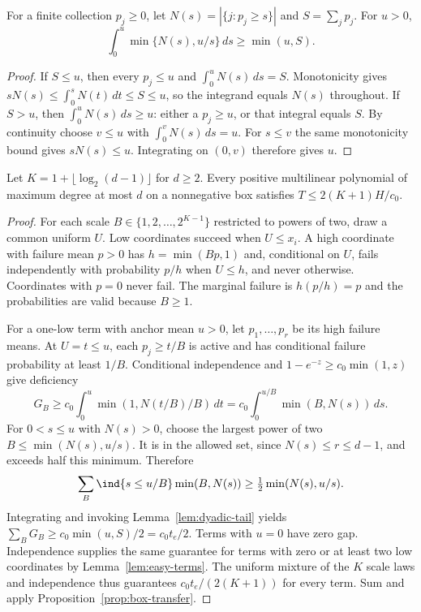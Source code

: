 \begin{lemma}\label{lem:dyadic-tail}
For a finite collection $p_j\ge0$, let $N(s)=|\{j:p_j\ge s\}|$ and
$S=\sum_jp_j$. For $u>0$,
\begin{equation}\label{eq:dyadic-tail}
 \int_0^u\min\{N(s),u/s\}\,ds\ge\min(u,S).
\end{equation}
\end{lemma}
\begin{proof}
If $S\le u$, then every $p_j\le u$ and $\int_0^uN(s)\,ds=S$.
Monotonicity gives $sN(s)\le\int_0^sN(t)\,dt\le S\le u$, so the
integrand equals $N(s)$ throughout. If $S>u$, then
$\int_0^uN(s)\,ds\ge u$: either a $p_j\ge u$, or that integral equals
$S$. By continuity choose $v\le u$ with $\int_0^vN(s)\,ds=u$.
For $s\le v$ the same monotonicity bound gives $sN(s)\le u$.
Integrating on $(0,v)$ therefore gives $u$.
\end{proof}

\begin{proposition}\label{prop:dyadic-degree}
Let $K=1+\lfloor\log_2(d-1)\rfloor$ for $d\ge2$. Every positive
multilinear polynomial of maximum degree at most $d$ on a nonnegative
box satisfies $T\le2(K+1)H/c_0$.
\end{proposition}
\begin{proof}
For each scale $B\in\{1,2,\ldots,2^{K-1}\}$ restricted to powers of
two, draw a common uniform $U$. Low coordinates succeed when $U\le x_i$.
A high coordinate with failure mean $p>0$ has $h=\min(Bp,1)$ and,
conditional on $U$, fails independently with probability $p/h$ when
$U\le h$, and never otherwise. Coordinates with $p=0$ never fail.
The marginal failure is $h(p/h)=p$ and the probabilities are valid
because $B\ge1$.

For a one-low term with anchor mean $u>0$, let $p_1,\ldots,p_r$ be
its high failure means. At $U=t\le u$, each $p_j\ge t/B$ is active
and has conditional failure probability at least $1/B$. Conditional
independence and $1-e^{-z}\ge c_0\min(1,z)$ give deficiency
\[
 G_B\ge c_0\int_0^u\min(1,N(t/B)/B)\,dt
       =c_0\int_0^{u/B}\min(B,N(s))\,ds.
\]
For $0<s\le u$ with $N(s)>0$, choose the largest power of two
$B\le\min(N(s),u/s)$. It is in the allowed set, since
$N(s)\le r\le d-1$, and exceeds half this minimum. Therefore
\[
 \sum_B\ind\{s\le u/B\}\min(B,N(s))
       \ge\tfrac12\min(N(s),u/s).
\]
Integrating and invoking Lemma~\ref{lem:dyadic-tail} yields
$\sum_BG_B\ge c_0\min(u,S)/2=c_0t_e/2$.
Terms with $u=0$ have zero gap. Independence supplies the same guarantee
for terms with zero or at least two low coordinates by
Lemma~\ref{lem:easy-terms}. The uniform mixture of the $K$ scale laws
and independence thus guarantees $c_0t_e/(2(K+1))$ for every term.
Sum and apply Proposition~\ref{prop:box-transfer}.
\end{proof}

